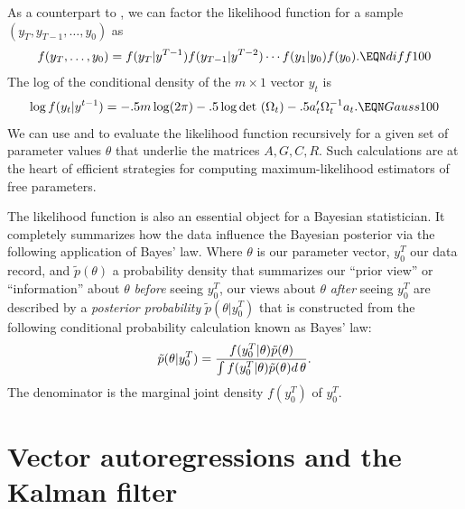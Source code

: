 As a counterpart to , we can factor the likelihood function for a sample $(y_T, y_{T-1}, \ldots, y_0)$ as
$$ f(y_T, \ldots, y_0) = f(y_T \vert y^{T-1})
     f(y_{T-1} \vert y^{T-2}) \cdots
       f(y_1 \vert y_0) f(y_0). \EQN diff100 $$
 The log  of the conditional density
of the $m\times 1$ vector  $y_{t}$ is
 $$  \log f(y_{t} \vert y^{t-1})  =  -.5 m \log (2 \pi)
  -.5 \log {\rm det} \ (\Omega_t)   - .5
a_t' \Omega_t^{-1} a_t .  \EQN Gauss100 $$
We can use  and  to evaluate  the likelihood function  
recursively for a given set of parameter values   $\theta$ that underlie the matrices $A, G, C, R$.
 Such calculations are at the heart of efficient strategies for computing
 maximum-likelihood
estimators of   free parameters.

The likelihood function is also an essential object for a Bayesian statistician.  It completely summarizes how the data influence
the Bayesian posterior via the following application
of Bayes' law.  Where $\theta$ is our parameter vector, $y_0^T$ our data record, and $\tilde p(\theta)$
 a probability density that summarizes our ``prior view'' or ``information'' about $\theta$ {\it before\/} seeing  $y_0^T$,
our views about $\theta$ {\it after\/} seeing $y_0^T$ are described by a  {\it posterior probability}  $\tilde p(\theta| y^T_0) $ that is constructed from
the following conditional probability calculation known as
Bayes' law:
$$ \tilde p(\theta| y^T_0) =
 {f(y^T_0| \theta ) \tilde p(\theta) \over \int f(y^T_0| \theta )  \tilde p(\theta) d\, \theta} . $$
 The denominator is the marginal joint density $f(y_0^T)$ of $y_0^T$.
%


\section{Vector autoregressions and the Kalman filter}\label{sec:VAR}%
